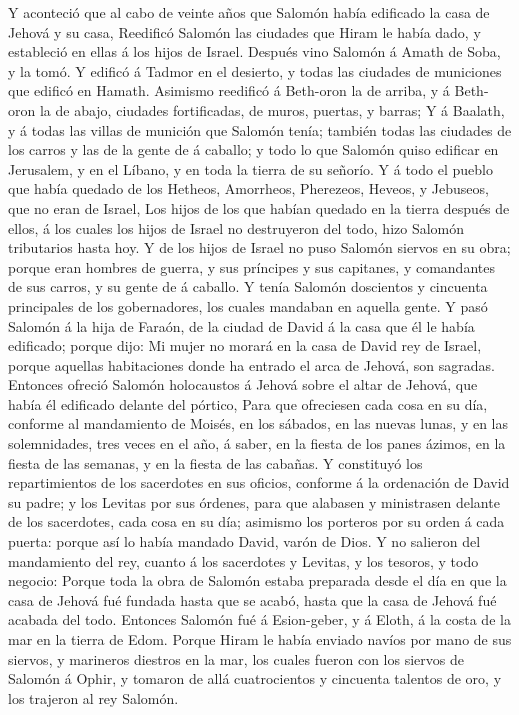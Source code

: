  Y aconteció que al cabo de veinte años que Salomón había
edificado la casa de Jehová y su casa,  Reedificó Salomón
las ciudades que Hiram le había dado, y estableció en ellas á los hijos
de Israel.  Después vino Salomón á Amath de Soba, y la
tomó.  Y edificó á Tadmor en el desierto, y todas las
ciudades de municiones que edificó en Hamath.  Asimismo
reedificó á Beth-oron la de arriba, y á Beth-oron la de abajo, ciudades
fortificadas, de muros, puertas, y barras;  Y á Baalath, y
á todas las villas de munición que Salomón tenía; también todas las
ciudades de los carros y las de la gente de á caballo; y todo lo que
Salomón quiso edificar en Jerusalem, y en el Líbano, y en toda la tierra
de su señorío.  Y á todo el pueblo que había quedado de
los Hetheos, Amorrheos, Pherezeos, Heveos, y Jebuseos, que no eran de
Israel,  Los hijos de los que habían quedado en la tierra
después de ellos, á los cuales los hijos de Israel no destruyeron del
todo, hizo Salomón tributarios hasta hoy.  Y de los hijos
de Israel no puso Salomón siervos en su obra; porque eran hombres de
guerra, y sus príncipes y sus capitanes, y comandantes de sus carros, y
su gente de á caballo.  Y tenía Salomón doscientos y
cincuenta principales de los gobernadores, los cuales mandaban en
aquella gente.  Y pasó Salomón á la hija de Faraón, de la
ciudad de David á la casa que él le había edificado; porque dijo: Mi
mujer no morará en la casa de David rey de Israel, porque aquellas
habitaciones donde ha entrado el arca de Jehová, son sagradas.
 Entonces ofreció Salomón holocaustos á Jehová sobre el
altar de Jehová, que había él edificado delante del pórtico,
 Para que ofreciesen cada cosa en su día, conforme al
mandamiento de Moisés, en los sábados, en las nuevas lunas, y en las
solemnidades, tres veces en el año, á saber, en la fiesta de los panes
ázimos, en la fiesta de las semanas, y en la fiesta de las cabañas.
 Y constituyó los repartimientos de los sacerdotes en sus
oficios, conforme á la ordenación de David su padre; y los Levitas por
sus órdenes, para que alabasen y ministrasen delante de los sacerdotes,
cada cosa en su día; asimismo los porteros por su orden á cada puerta:
porque así lo había mandado David, varón de Dios.  Y no
salieron del mandamiento del rey, cuanto á los sacerdotes y Levitas, y
los tesoros, y todo negocio:  Porque toda la obra de
Salomón estaba preparada desde el día en que la casa de Jehová fué
fundada hasta que se acabó, hasta que la casa de Jehová fué acabada del
todo.  Entonces Salomón fué á Esion-geber, y á Eloth, á
la costa de la mar en la tierra de Edom.  Porque Hiram le
había enviado navíos por mano de sus siervos, y marineros diestros en la
mar, los cuales fueron con los siervos de Salomón á Ophir, y tomaron de
allá cuatrocientos y cincuenta talentos de oro, y los trajeron al rey
Salomón.

